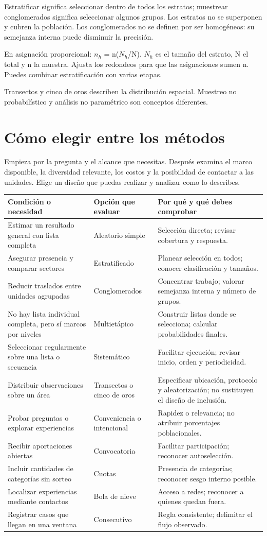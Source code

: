 \documentclass[11pt,letterpaper]{article}
\begin{document}
Estratificar significa seleccionar dentro de todos los estratos; muestrear conglomerados significa seleccionar algunos grupos. Los estratos no se superponen y cubren la población. Los conglomerados no se definen por ser homogéneos: su semejanza interna puede disminuir la precisión.

En asignación proporcional: \(n_h\) = n(\(N_h\)/N). \(N_h\) es el tamaño del estrato, N el total y n la muestra. Ajusta los redondeos para que las asignaciones sumen n. Puedes combinar estratificación con varias etapas.

Transectos y cinco de oros describen la distribución espacial. Muestreo no probabilístico y análisis no paramétrico son conceptos diferentes.

\clearpage
\section{Cómo elegir entre los métodos}
Empieza por la pregunta y el alcance que necesitas. Después examina el marco disponible, la diversidad relevante, los costos y la posibilidad de contactar a las unidades. Elige un diseño que puedas realizar y analizar como lo describes.
\begin{longtable}{p{}p{}p{}}
\toprule\rowcolor{cabecera} Condición o necesidad & Opción que evaluar & Por qué y qué debes comprobar \\ \midrule
Estimar un resultado general con lista completa & Aleatorio simple & Selección directa; revisar cobertura y respuesta. \\
Asegurar presencia y comparar sectores & Estratificado & Planear selección en todos; conocer clasificación y tamaños. \\
Reducir traslados entre unidades agrupadas & Conglomerados & Concentrar trabajo; valorar semejanza interna y número de grupos. \\
No hay lista individual completa, pero sí marcos por niveles & Multietápico & Construir listas donde se selecciona; calcular probabilidades finales. \\
Seleccionar regularmente sobre una lista o secuencia & Sistemático & Facilitar ejecución; revisar inicio, orden y periodicidad. \\
Distribuir observaciones sobre un área & Transectos o cinco de oros & Especificar ubicación, protocolo y aleatorización; no sustituyen el diseño de inclusión. \\
Probar preguntas o explorar experiencias & Conveniencia o intencional & Rapidez o relevancia; no atribuir porcentajes poblacionales. \\
Recibir aportaciones abiertas & Convocatoria & Facilitar participación; reconocer autoselección. \\
Incluir cantidades de categorías sin sorteo & Cuotas & Presencia de categorías; reconocer sesgo interno posible. \\
Localizar experiencias mediante contactos & Bola de nieve & Acceso a redes; reconocer a quienes quedan fuera. \\
Registrar casos que llegan en una ventana & Consecutivo & Regla consistente; delimitar el flujo observado. \\
\bottomrule
\end{longtable}
\end{document}
